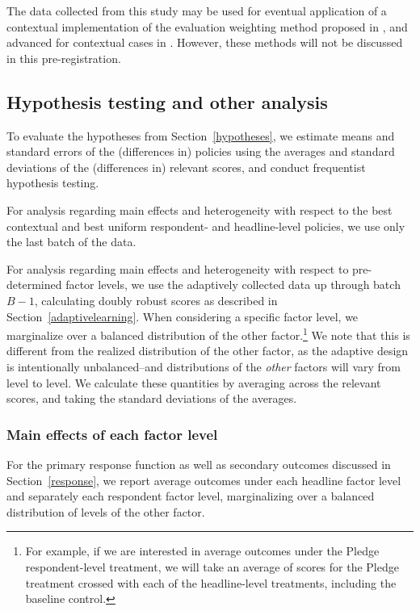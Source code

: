 \documentclass[letterpaper, 12pt, parskip=full,DIV=10]{scrartcl}
\begin{document}
The data collected from this study may be used for eventual application of a contextual implementation of the evaluation weighting method proposed in \cite{hadad2019confidence}, and advanced for contextual cases in \cite{zhan2020retrospective}. However, these methods will not be discussed in this pre-registration. 


\subsection{Hypothesis testing and other analysis}
To evaluate the hypotheses from Section~\ref{hypotheses}, we estimate means and standard errors of the (differences in) policies using the averages and standard deviations of the (differences in) relevant scores, and conduct frequentist hypothesis testing. 

For analysis regarding main effects and heterogeneity with respect to the best contextual and best uniform respondent- and headline-level policies, we use only the last batch of the data. %

For analysis regarding main effects and heterogeneity with respect to pre-determined factor levels, we use the adaptively collected data up through batch $B-1$, calculating doubly robust scores as described in Section~\ref{adaptivelearning}. When considering a specific factor level, we marginalize over a balanced distribution of the other factor.\footnote{For example, if we are interested in average outcomes under the Pledge respondent-level treatment, we will take an average of scores for the Pledge treatment crossed with each of the headline-level treatments, including the baseline control.} %
We note that this is different from the realized distribution of the other factor, as the adaptive design is intentionally unbalanced--and distributions of the \textit{other} factors will vary from level to level. We calculate these quantities by averaging across the relevant scores, and taking the standard deviations of the averages. 

\subsubsection{Main effects of each factor level}\label{main}
For the primary response function as well as secondary outcomes discussed in Section~\ref{response}, we report average outcomes under each headline factor level and separately each respondent factor level, marginalizing over a balanced distribution of levels of the other factor.
\end{document}
